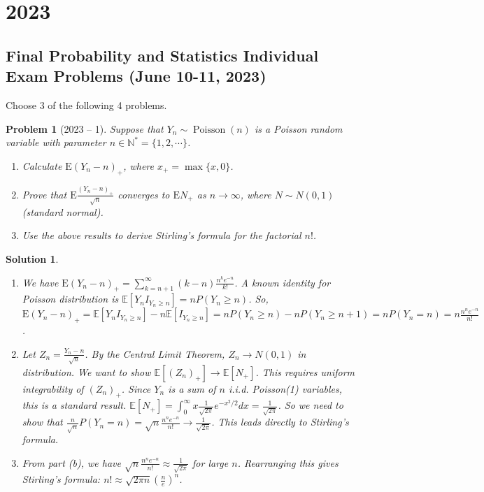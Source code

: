 \documentclass[12pt]{amsart}
\newtheorem{problem}{Problem}
\newtheorem*{solution}{Solution}
\begin{document}
\section*{2023}
\subsection*{Final Probability and Statistics Individual Exam Problems (June 10-11, 2023)}
Choose 3 of the following 4 problems.

\begin{problem}[2023 -- 1]
Suppose that $Y_n \sim \operatorname{Poisson}(n)$ is a Poisson random variable with parameter $n \in \mathbb{N}^*=\{1,2, \cdots\}$.
\begin{enumerate}[label=(\alph*)]
\item Calculate $\mathrm{E}(Y_n-n)_{+}$, where $x_{+}=\max \{x, 0\}$.
\item Prove that $\mathrm{E} \frac{(Y_n-n)_{+}}{\sqrt{n}}$ converges to $\mathrm{E} N_{+}$ as $n \rightarrow \infty$, where $N \sim N(0,1)$ (standard normal).
\item Use the above results to derive Stirling's formula for the factorial $n!$.
\end{enumerate}
\end{problem}
\begin{solution}
\begin{enumerate}[label=(\alph*)]
\item We have $\mathrm{E}(Y_n-n)_{+} = \sum_{k=n+1}^{\infty} (k-n) \frac{n^k e^{-n}}{k!}$.
A known identity for Poisson distribution is $\mathbb{E}[Y_n I_{Y_n \ge n}] = n P(Y_n \ge n)$.
So, $\mathrm{E}(Y_n-n)_{+} = \mathbb{E}[Y_n I_{Y_n \ge n}] - n \mathbb{E}[I_{Y_n \ge n}] = n P(Y_n \ge n) - n P(Y_n \ge n+1) = n P(Y_n=n) = n\frac{n^n e^{-n}}{n!}$.
\item Let $Z_n = \frac{Y_n-n}{\sqrt{n}}$. By the Central Limit Theorem, $Z_n \to N(0,1)$ in distribution. We want to show $\mathbb{E}[(Z_n)_+] \to \mathbb{E}[N_+]$. This requires uniform integrability of $(Z_n)_+$. Since $Y_n$ is a sum of $n$ i.i.d. Poisson(1) variables, this is a standard result.
$\mathbb{E}[N_+] = \int_0^\infty x \frac{1}{\sqrt{2\pi}} e^{-x^2/2} dx = \frac{1}{\sqrt{2\pi}}$.
So we need to show that $\frac{n}{\sqrt{n}} P(Y_n=n) = \sqrt{n} \frac{n^n e^{-n}}{n!} \to \frac{1}{\sqrt{2\pi}}$. This leads directly to Stirling's formula.
\item From part (b), we have $\sqrt{n} \frac{n^n e^{-n}}{n!} \approx \frac{1}{\sqrt{2\pi}}$ for large $n$.
Rearranging this gives Stirling's formula: $n! \approx \sqrt{2\pi n} (\frac{n}{e})^n$.
\end{enumerate}
\end{solution}
\end{document}
